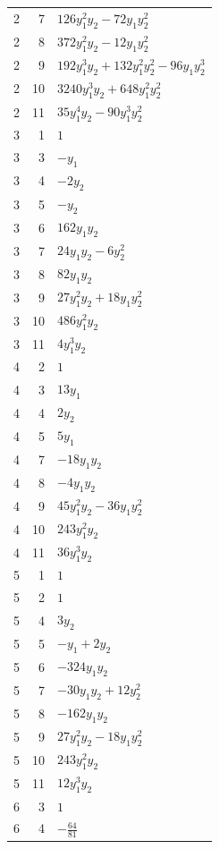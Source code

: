 \documentclass[10pt,a4paper]{article}
\begin{document}
{\begin{longtable}{rrp{125mm}}
2 & 7 & $126 y_{1}^{2} y_{2} - 72 y_{1} y_{2}^{2}$\\
2 & 8 & $372 y_{1}^{2} y_{2} - 12 y_{1} y_{2}^{2}$\\
2 & 9 & $192 y_{1}^{3} y_{2} + 132 y_{1}^{2} y_{2}^{2} - 96 y_{1} y_{2}^{3}$\\
2 & 10 & $3240 y_{1}^{3} y_{2} + 648 y_{1}^{2} y_{2}^{2}$\\
2 & 11 & $35 y_{1}^{4} y_{2} - 90 y_{1}^{3} y_{2}^{2}$\\
3 & 1 & $1$\\
3 & 3 & $- y_{1}$\\
3 & 4 & $- 2 y_{2}$\\
3 & 5 & $- y_{2}$\\
3 & 6 & $162 y_{1} y_{2}$\\
3 & 7 & $24 y_{1} y_{2} - 6 y_{2}^{2}$\\
3 & 8 & $82 y_{1} y_{2}$\\
3 & 9 & $27 y_{1}^{2} y_{2} + 18 y_{1} y_{2}^{2}$\\
3 & 10 & $486 y_{1}^{2} y_{2}$\\
3 & 11 & $4 y_{1}^{3} y_{2}$\\
4 & 2 & $1$\\
4 & 3 & $13 y_{1}$\\
4 & 4 & $2 y_{2}$\\
4 & 5 & $5 y_{1}$\\
4 & 7 & $- 18 y_{1} y_{2}$\\
4 & 8 & $- 4 y_{1} y_{2}$\\
4 & 9 & $45 y_{1}^{2} y_{2} - 36 y_{1} y_{2}^{2}$\\
4 & 10 & $243 y_{1}^{2} y_{2}$\\
4 & 11 & $36 y_{1}^{3} y_{2}$\\
5 & 1 & $1$\\
5 & 2 & $1$\\
5 & 4 & $3 y_{2}$\\
5 & 5 & $- y_{1} + 2 y_{2}$\\
5 & 6 & $- 324 y_{1} y_{2}$\\
5 & 7 & $- 30 y_{1} y_{2} + 12 y_{2}^{2}$\\
5 & 8 & $- 162 y_{1} y_{2}$\\
5 & 9 & $27 y_{1}^{2} y_{2} - 18 y_{1} y_{2}^{2}$\\
5 & 10 & $243 y_{1}^{2} y_{2}$\\
5 & 11 & $12 y_{1}^{3} y_{2}$\\
6 & 3 & $1$\\
6 & 4 & $- \frac{64}{81}$\\

\end{longtable}}
\end{document}
